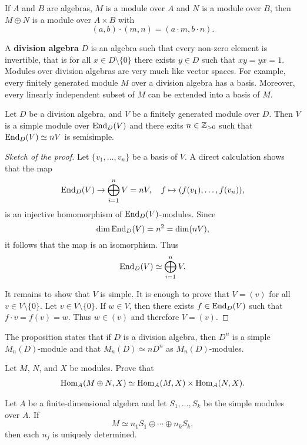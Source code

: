 \begin{exercise}
If $A$ and $B$ are algebras, $M$ is a module over $A$ and $N$ is a module over $B$, then 
    $M\oplus N$ is a module over $A\times B$ with 
    \[
    (a,b)\cdot (m,n)=(a\cdot m,b\cdot n).
    \]
\end{exercise}


A \textbf{division algebra} $D$ is an algebra such that every non-zero element 
is invertible, that is for all $x\in D\setminus\{0\}$ there exists $y\in D$ such that $xy=yx=1$.  
Modules over division algebras are very much like vector spaces.  For example, 
every finitely generated module $M$ over a division algebra has a basis. 
Moreover, every linearly independent subset of
$M$ can be extended into a basis of $M$. 

\begin{proposition}
	Let $D$ be a division algebra, and $V$ be a finitely generated module over $D$. Then 
	$V$ is a simple module over $\operatorname{End}_D(V)$ and there exits $n\in\mathbb{Z}_{>0}$ such that  
	$\operatorname{End}_D(V)\simeq nV$ is semisimple.
\end{proposition}

\begin{proof}[Sketch of the proof]
	Let $\{v_1,\dots,v_n\}$ be a basis of $V$. A direct calculation shows that the map 
	\[
		\operatorname{End}_D(V)\to\bigoplus_{i=1}^nV=nV,\quad
		f\mapsto (f(v_1),\dots,f(v_n)),
	\]
	is an injective homomorphism of $\operatorname{End}_D(V)$-modules.
	Since
	\[
	\dim\operatorname{End}_D(V)=n^2=\dim(nV),
	\]
	it follows that the map is an isomorphism. 
	Thus 
	\[
		\operatorname{End}_D(V)\simeq \bigoplus_{i=1}^nV.
	\]
	
	It remains to show that $V$ is simple. It is enough to prove that $V=(v)$ 
	for all $v\in V\setminus\{0\}$. Let $v\in V\setminus\{0\}$. If $w\in V$, then 
	there exists $f\in\operatorname{End}_D(V)$ such that $f\cdot v=f(v)=w$. 
	Thus $w\in (v)$ and therefore $V=(v)$.  
\end{proof}

The proposition states that if $D$ is a division algebra, then  
$D^{n}$ is a simple $M_n(D)$-module and that $M_n(D)\simeq n D^n$ as $M_n(D)$-modules. 

\begin{exercise}
    Let $M$, $N$, and $X$ be modules. Prove that 
    \begin{align}
        \operatorname{Hom}_A(M\oplus N,X)\simeq\operatorname{Hom}_A(M,X)\times\operatorname{Hom}_A(N,X).
    \end{align}
\end{exercise}

\begin{theorem}
Let $A$ be a finite-dimensional algebra and let 
$S_1,\dots,S_k$ be the simple modules over $A$. 
If 
\[
M\simeq n_1S_1\oplus\cdots\oplus n_kS_k,
\]
then each $n_j$ is uniquely determined.  
\end{theorem}

